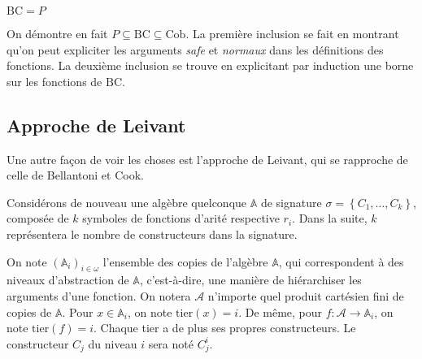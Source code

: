 \documentclass{report}
\newcommand{\bbA}{\mathbb{A}}
\begin{document}
			
			\begin{theorem}
				\label{thm:BC_equals_P}
				$\text{BC} = P$
			\end{theorem}
	
			On démontre en fait $P \subseteq \text{BC} \subseteq \text{Cob}$. La première inclusion se fait en montrant qu'on peut expliciter les arguments \emph{safe} et \emph{normaux} dans les définitions des fonctions. La deuxième inclusion se trouve en explicitant par induction une borne sur les fonctions de $\text{BC}$. 
		
		
		
		\subsection{Approche de Leivant}
		\label{subsec:Leivant}
	
			Une autre façon de voir les choses est l'approche de Leivant, qui se rapproche de celle de Bellantoni et Cook.
			
			Considérons de nouveau une algèbre quelconque $\bbA$ de signature $\sigma = \left\lbrace C_1, \dots, C_k \right\rbrace$, composée de $k$ symboles de fonctions d'arité respective $r_i$. Dans la suite, $k$ représentera le nombre de constructeurs dans la signature.
			
			\espace
				
			On note $(\bbA_i)_{i\in \omega}$ l'ensemble des copies de l'algèbre $\bbA$, qui correspondent à des niveaux d'abstraction de $\bbA$, c'est-à-dire, une manière de hiérarchiser les arguments d'une fonction. On notera $\mathcal{A}$ n'importe quel produit cartésien fini de copies de $\bbA$. Pour $x\in \bbA_i$, on note $\text{tier}(x) = i$. De même, pour $f : \mathcal{A} \to \bbA_i$, on note $\text{tier}(f) = i$. Chaque tier a de plus ses propres constructeurs. Le constructeur $C_j$ du niveau $i$ sera noté $C_j^i$. 
			
\end{document}
